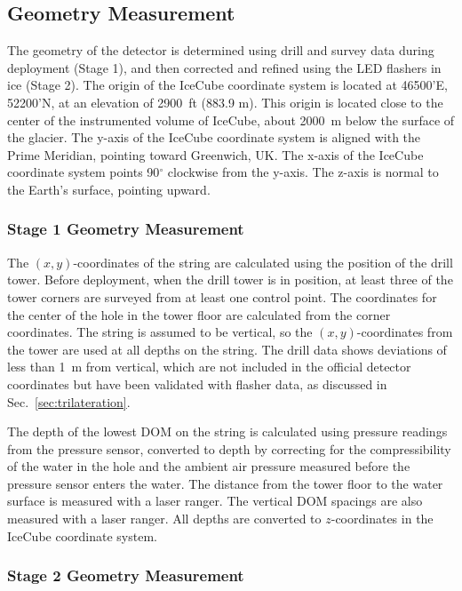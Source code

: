 \subsection{Geometry Measurement}

The geometry of the detector is determined using drill and survey data
during deployment (Stage 1), and then corrected and refined using the LED
flashers in ice (Stage 2). The origin of the IceCube coordinate system
is located at 46500'E, 52200'N, at an elevation of 2900~ft (883.9
m). This origin is located close to the center of the instrumented volume of
IceCube, about 2000~m below the surface of the glacier. The y-axis of
the IceCube coordinate system is aligned with the Prime Meridian,
pointing toward Greenwich, UK. The x-axis of the IceCube coordinate
system points 90$^{\circ}$ clockwise from the y-axis. The z-axis is
normal to the Earth's surface, pointing upward. 

\subsubsection{Stage 1 Geometry Measurement}
The $(x,y)$-coordinates of the string are calculated using the position of
the drill tower. Before deployment, when the drill tower is in position, at
least three of the tower corners are surveyed from at least one control
point.  The coordinates for the center of the hole in the tower floor are
calculated from the corner coordinates. The string is assumed to be
vertical, so the $(x,y)$-coordinates from the tower are used at all
depths on the string. The drill
data shows deviations of less than 1~m from vertical, which are not
included in the official detector coordinates but have been validated
with flasher data, as discussed in Sec.~\ref{sec:trilateration}. 

The depth of the lowest DOM on the string is calculated using pressure
readings from the pressure sensor, converted to depth by correcting for the
compressibility of the water in the hole and the ambient air pressure
measured before the pressure sensor enters the water. The distance from the
tower floor to the water surface is measured with a laser ranger. The
vertical DOM spacings are also measured with a laser
ranger. All depths are converted to $z$-coordinates in the IceCube
coordinate system.

\subsubsection{Stage 2 Geometry Measurement}

